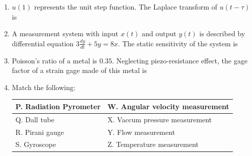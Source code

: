 \documentclass[journal,12pt,onecolumn]{IEEEtran}
\theoremstyle{remark}
\begin{document}
\begin{enumerate}
\item $u(1)$ represents the unit step function. The Laplace transform of $u(t - \tau)$ is

\hfill{}
\begin{enumerate}
\end{enumerate}

\item A measurement system with input $x(t)$ and output $y(t)$ is described by differential equation $3\frac{dy}{dt} + 5y = 8x$. The static sensitivity of the system is

\hfill{}
\begin{enumerate}
\end{enumerate}

\item Poisson's ratio of a metal is $0.35$. Neglecting piezo-resistance effect, the gage factor of a strain gage made of this metal is

\hfill{}
\begin{enumerate}
\end{enumerate}

\item Match the following:
\begin{center}
\begin{tabular}{|m{18em}|m{18em}|}
\hline
    P. Radiation Pyrometer & W. Angular velocity measurement  \\
\hline
    Q. Dall tube & X. Vaccum pressure measurement \\
\hline
    R. Pirani gauge & Y. Flow measurement \\
\hline
    S. Gyroscope & Z. Temperature measurement \\
    \hline
\end{tabular}
\end{center}


\end{enumerate}
\end{document}
